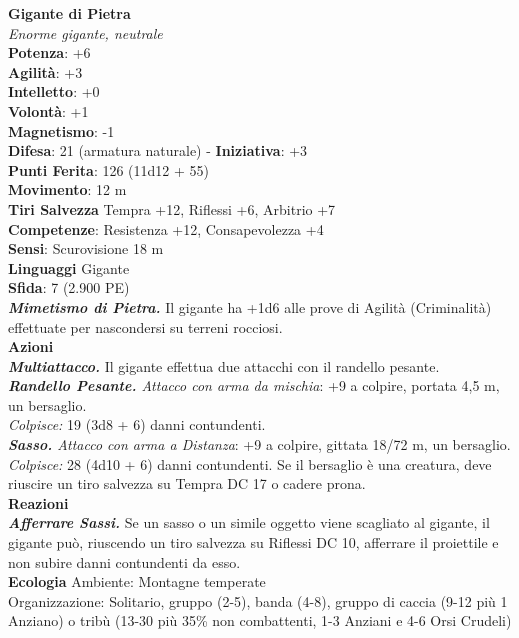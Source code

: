 \begin{multicols}{2}
\medskip\textbf{Gigante di Pietra}\\
\emph{Enorme gigante, neutrale}\\
\textbf{Potenza}: +6\\
\textbf{Agilità}: +3\\
\textbf{Intelletto}: +0\\
\textbf{Volontà}: +1\\
\textbf{Magnetismo}: -1\\
\textbf{Difesa}: 21 (armatura naturale) - \textbf{Iniziativa}: +3\\
\textbf{Punti Ferita}: 126 (11d12 + 55)\\
\textbf{Movimento}: 12 m\\
\textbf{Tiri Salvezza} Tempra +12, Riflessi +6, Arbitrio +7\\
\textbf{Competenze}: Resistenza +12, Consapevolezza +4\\
\textbf{Sensi}: Scurovisione 18 m\\
\textbf{Linguaggi} Gigante\\
\textbf{Sfida}: 7 (2.900 PE)\smallskip\\
\emph{\textbf{Mimetismo di Pietra.}} Il gigante ha +1d6 alle prove di Agilità (Criminalità) effettuate per nascondersi su terreni rocciosi.\\
\smallskip\textbf{Azioni}\\
\emph{\textbf{Multiattacco.}} Il gigante effettua due attacchi con il randello pesante.\\
\emph{\textbf{Randello Pesante.} Attacco con arma da mischia}: +9 a colpire, portata 4,5 m, un bersaglio.\\
\emph{Colpisce:} 19 (3d8 + 6) danni contundenti.\\
\emph{\textbf{Sasso.} Attacco con arma a Distanza}: +9 a colpire, gittata 18/72 m, un bersaglio.\\
\emph{Colpisce:} 28 (4d10 + 6) danni contundenti. Se il bersaglio è una creatura, deve riuscire un tiro salvezza su Tempra DC 17 o cadere prona.\\
\textbf{Reazioni}\\
\emph{\textbf{Afferrare Sassi.}} Se un sasso o un simile oggetto viene scagliato al gigante, il gigante può, riuscendo un tiro salvezza su Riflessi DC 10, afferrare il proiettile e non subire danni contundenti da esso.\\
\textbf{Ecologia}
Ambiente: Montagne temperate\\
Organizzazione: Solitario, gruppo (2-5), banda (4-8), gruppo di caccia (9-12 più 1 Anziano) o tribù (13-30 più 35\% non combattenti, 1-3 Anziani e 4-6 Orsi Crudeli)\\

\end{multicols}
